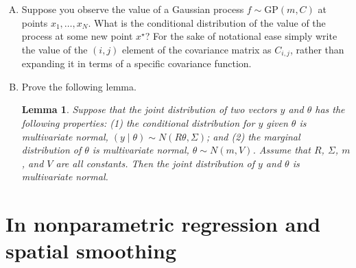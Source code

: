 \documentclass[11pt]{article}
\newtheorem{lemma}[theorem]{Lemma}
\begin{document}
\begin{enumerate}[(A)]
\item Suppose you observe the value of a Gaussian process $f \sim \mbox{GP}(m,C)$ at points $x_1, \ldots, x_N$.  What is the conditional distribution of the value of the process at some new point $x^{\star}$?  For the sake of notational ease simply write the value of the $(i,j)$ element of the covariance matrix as $C_{i,j}$, rather than expanding it in terms of a specific covariance function.

\item Prove the following lemma.

\begin{lemma}
Suppose that the joint distribution of two vectors $y$ and $\theta$ has the following properties: (1) the conditional distribution for $y$ given $\theta$ is multivariate normal, $(y \mid \theta) \sim N(R\theta, \Sigma)$; and (2) the marginal distribution of $\theta$ is multivariate normal, $\theta \sim N(m,V)$.  Assume that $R$, $\Sigma$, $m$, and $V$ are all constants.  Then the joint distribution of $y$ and $\theta$ is multivariate normal.
\end{lemma}

\end{enumerate}


\section{In nonparametric regression and spatial smoothing}
\end{document}
